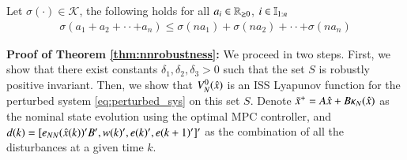\documentclass[preprint,5p, twocolumn, authoryear]{elsarticle}
\begin{document}
\begin{prop} \label{prop:Kfunction_inequality} Let $\sigma(\cdot) \in
    \mathcal{K}$, the following holds for all $a_i \in \mathbb{R}_{\geq 0}$, $i \in
    \mathbb{I}_{1:n}$ 
    \begin{align*}
        \sigma(a_1 + a_2 + \cdot \cdot + a_n) \leq \sigma(na_1) + 
        \sigma(na_2) + \cdot \cdot + \sigma(na_n)
    \end{align*}    
\end{prop}

\textbf{Proof of Theorem \ref{thm:nnrobustness}:} We proceed in two steps.
First, we show that there exist constants $\delta_1, \delta_2, \delta_3 > 0$
such that the set $S$ is robustly positive invariant. Then, we show that
$V_N^0(\hat{x})$ is an ISS Lyapunov function for the perturbed system
\eqref{eq:perturbed_sys} on this set $S$. Denote $\tilde{x}^+ = A\hat{x} +
B\kappa_N(\hat{x})$ as the nominal state evolution using the optimal MPC
controller, and $d(k) = [ e_{NN}(\hat{x}(k))'B', w(k)', e(k)', e(k+1)']'$ as the
combination of all the disturbances at a given time $k$. 
\end{document}
